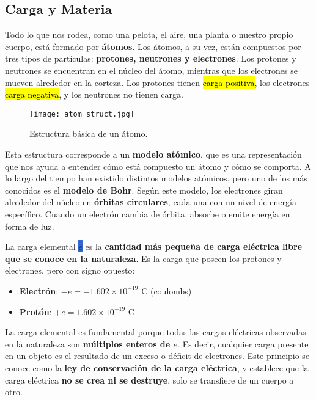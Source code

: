\subsection{Carga y Materia}

Todo lo que nos rodea, como una pelota, el aire, una planta o nuestro propio cuerpo, está formado por \textbf{átomos}. Los átomos, a su vez, están compuestos por tres tipos de partículas: \textbf{protones, neutrones y electrones}. Los protones y neutrones se encuentran en el núcleo del átomo, mientras que los electrones se mueven alrededor en la corteza. Los protones tienen \hl{carga positiva}, los electrones \hl{carga negativa}, y los neutrones no tienen carga. 

\begin{figure}[ht]
    \centering
    \texttt{[image: atom\_struct.jpg]}
    \caption{Estructura básica de un átomo.}
    \label{fig:atom_struct}
\end{figure}

Esta estructura corresponde a un \textbf{modelo atómico}, que es una representación que nos ayuda a entender cómo está compuesto un átomo y cómo se comporta. A lo largo del tiempo han existido distintos modelos atómicos, pero uno de los más conocidos es el \textbf{modelo de Bohr}. Según este modelo, los electrones giran alrededor del núcleo en \textbf{órbitas circulares}, cada una con un nivel de energía específico. Cuando un electrón cambia de órbita, absorbe o emite energía en forma de luz.

La carga elemental \colorbox{highlight}{\( e \)} es la \textbf{cantidad más pequeña de carga eléctrica libre que se conoce en la naturaleza}. Es la carga que poseen los protones y electrones, pero con signo opuesto:
\begin{itemize}
    \item \textbf{Electrón}: \( -e = -1.602 \times 10^{-19} \) C (coulombs)
    \item \textbf{Protón}: \( +e = 1.602 \times 10^{-19} \) C
\end{itemize}

La carga elemental es fundamental porque todas las cargas eléctricas observadas en la naturaleza son \textbf{múltiplos enteros de \( e \)}. Es decir, cualquier carga presente en un objeto es el resultado de un exceso o déficit de electrones. Este principio se conoce como la \textbf{ley de conservación de la carga eléctrica}, y establece que la carga eléctrica \textbf{no se crea ni se destruye}, solo se transfiere de un cuerpo a otro.  

